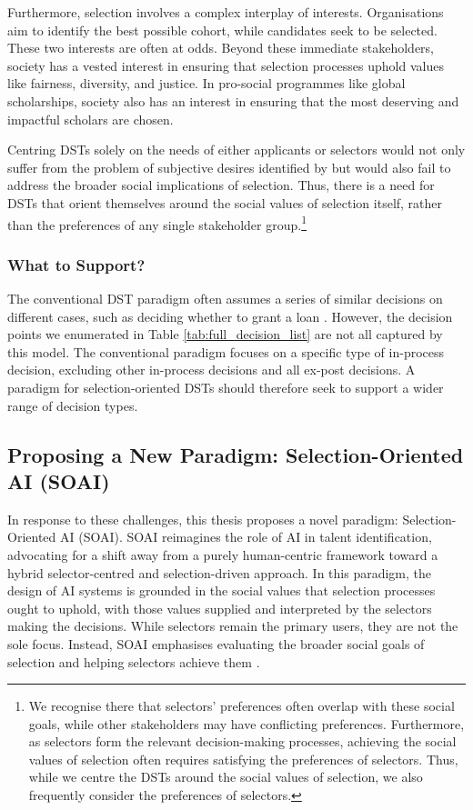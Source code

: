 Furthermore, selection involves a complex interplay of interests. Organisations aim to identify the best possible cohort, while candidates seek to be selected. These two interests are often at odds. Beyond these immediate stakeholders, society has a vested interest in ensuring that selection processes uphold values like fairness, diversity, and justice. In pro-social programmes like global scholarships, society also has an interest in ensuring that the most deserving and impactful scholars are chosen.

Centring DSTs solely on the needs of either applicants or selectors would not only suffer from the problem of subjective desires identified by \textcite{Lipton} but would also fail to address the broader social implications of selection. Thus, there is a need for DSTs that orient themselves around the social values of selection itself, rather than the preferences of any single stakeholder group.\footnote{We recognise there that selectors' preferences often overlap with these social goals, while other stakeholders may have conflicting preferences. Furthermore, as selectors form the relevant decision-making processes, achieving the social values of selection often requires satisfying the preferences of selectors. Thus, while we centre the DSTs around the social values of selection, we also frequently consider the preferences of selectors.}

\subsubsection{What to Support?}
The conventional DST paradigm often assumes a series of similar decisions on different cases, such as deciding whether to grant a loan \cite{GiveMeSomeCredit,barocas_hidden_2020,ustun_actionable_2019,Rebitschek_Gigerenzer_Wagner_2021,10.1111/j.1467-954X.2007.00740.x}. However, the decision points we enumerated in Table \ref{tab:full_decision_list} are not all captured by this model. The conventional paradigm focuses on a specific type of in-process decision, excluding other in-process decisions and all ex-post decisions. A paradigm for selection-oriented DSTs should therefore seek to support a wider range of decision types.

\subsection{Proposing a New Paradigm: Selection-Oriented AI (SOAI)}
In response to these challenges, this thesis proposes a novel paradigm: Selection-Oriented AI (SOAI). SOAI reimagines the role of AI in talent identification, advocating for a shift away from a purely human-centric framework toward a hybrid selector-centred and selection-driven approach. In this paradigm, the design of AI systems is grounded in the social values that selection processes ought to uphold, with those values supplied and interpreted by the selectors making the decisions. While selectors remain the primary users, they are not the sole focus. Instead, SOAI emphasises evaluating the broader social goals of selection and helping selectors achieve them \cite{batyavalue}.


